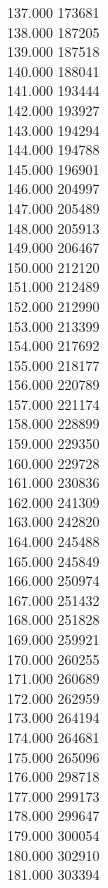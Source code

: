 { 137.000	173681 \\
 138.000	187205 \\
 139.000	187518 \\
 140.000	188041 \\
 141.000	193444 \\
 142.000	193927 \\
 143.000	194294 \\
 144.000	194788 \\
 145.000	196901 \\
 146.000	204997 \\
 147.000	205489 \\
 148.000	205913 \\
 149.000	206467 \\
 150.000	212120 \\
 151.000	212489 \\
 152.000	212990 \\
 153.000	213399 \\
 154.000	217692 \\
 155.000	218177 \\
 156.000	220789 \\
 157.000	221174 \\
 158.000	228899 \\
 159.000	229350 \\
 160.000	229728 \\
 161.000	230836 \\
 162.000	241309 \\
 163.000	242820 \\
 164.000	245488 \\
 165.000	245849 \\
 166.000	250974 \\
 167.000	251432 \\
 168.000	251828 \\
 169.000	259921 \\
 170.000	260255 \\
 171.000	260689 \\
 172.000	262959 \\
 173.000	264194 \\
 174.000	264681 \\
 175.000	265096 \\
 176.000	298718 \\
 177.000	299173 \\
 178.000	299647 \\
 179.000	300054 \\
 180.000	302910 \\
 181.000	303394 \\
}
